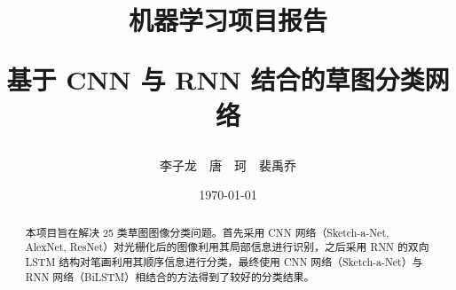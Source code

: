 \documentclass{airep}
\title{
    \large \color{maintheme!70!black} 机器学习项目报告\par\vspace{10pt}
    \color{maintheme!70!black}\bfseries\Large 基于 CNN 与 RNN 结合的草图分类网络  %
}
\author{\kaishu 李子龙~~唐　珂~~裴禹乔}
\date{\today}
\begin{document}
\maketitle
\begin{abstract}
本项目旨在解决 25 类草图图像分类问题。首先采用 CNN 网络（Sketch-a-Net, AlexNet, ResNet）对光栅化后的图像利用其局部信息进行识别，之后采用 RNN 的双向 LSTM 结构对笔画利用其顺序信息进行分类，最终使用 CNN 网络（Sketch-a-Net）与 RNN 网络（BiLSTM）相结合的方法得到了较好的分类结果。
\end{abstract}







\printbibliography
\end{document}
